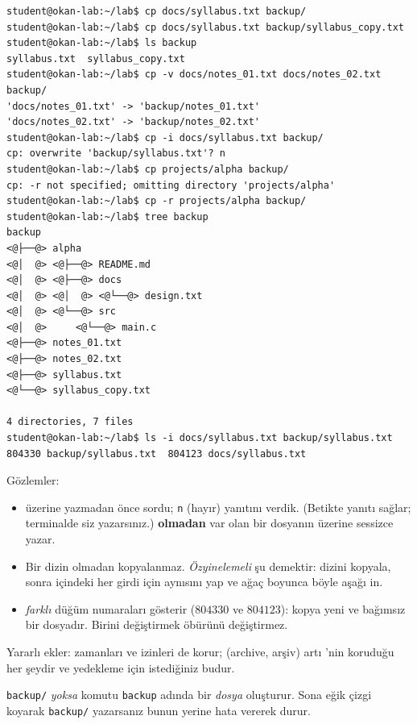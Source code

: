 \begin{lstlisting}[style=term]
student@okan-lab:~/lab$ cp docs/syllabus.txt backup/
student@okan-lab:~/lab$ cp docs/syllabus.txt backup/syllabus_copy.txt
student@okan-lab:~/lab$ ls backup
syllabus.txt  syllabus_copy.txt
student@okan-lab:~/lab$ cp -v docs/notes_01.txt docs/notes_02.txt backup/
'docs/notes_01.txt' -> 'backup/notes_01.txt'
'docs/notes_02.txt' -> 'backup/notes_02.txt'
student@okan-lab:~/lab$ cp -i docs/syllabus.txt backup/
cp: overwrite 'backup/syllabus.txt'? n
student@okan-lab:~/lab$ cp projects/alpha backup/
cp: -r not specified; omitting directory 'projects/alpha'
student@okan-lab:~/lab$ cp -r projects/alpha backup/
student@okan-lab:~/lab$ tree backup
backup
<@├──@> alpha
<@│  @> <@├──@> README.md
<@│  @> <@├──@> docs
<@│  @> <@│  @> <@└──@> design.txt
<@│  @> <@└──@> src
<@│  @>     <@└──@> main.c
<@├──@> notes_01.txt
<@├──@> notes_02.txt
<@├──@> syllabus.txt
<@└──@> syllabus_copy.txt

4 directories, 7 files
student@okan-lab:~/lab$ ls -i docs/syllabus.txt backup/syllabus.txt
804330 backup/syllabus.txt  804123 docs/syllabus.txt
\end{lstlisting}

Gözlemler:
\begin{itemize}
  \item {} üzerine yazmadan önce sordu; \texttt{n} (hayır) yanıtını verdik. (Betikte yanıtı  sağlar; terminalde siz yazarsınız.)  \textbf{olmadan}  var olan bir dosyanın üzerine sessizce yazar.
  \item Bir dizin  olmadan kopyalanmaz. \emph{Özyinelemeli} şu demektir: dizini kopyala, sonra içindeki her girdi için aynısını yap ve ağaç boyunca böyle aşağı in.
  \item {} \emph{farklı} düğüm numaraları gösterir ($804330$ ve $804123$): kopya yeni ve bağımsız bir dosyadır. Birini değiştirmek öbürünü değiştirmez.
\end{itemize}
Yararlı ekler:  zamanları ve izinleri de korur;  (archive, arşiv)  artı 'nin koruduğu her şeydir ve yedekleme için istediğiniz budur.

\begin{tryit}
\texttt{backup/} \emph{yoksa}  komutu \texttt{backup} adında bir \emph{dosya} oluşturur. Sona eğik çizgi koyarak \texttt{backup/} yazarsanız  bunun yerine hata vererek durur.
\end{tryit}

